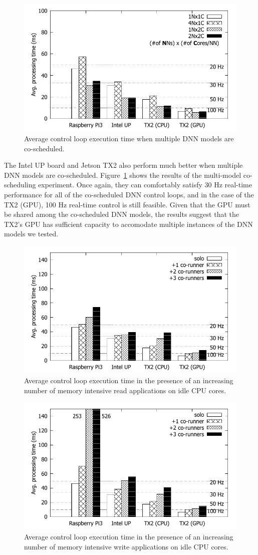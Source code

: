 \begin{figure}[h]
  \centering
  \includegraphics[width=.45\textwidth]{figs/compare_model}
  \caption{Average control loop execution time when multiple DNN
    models are co-scheduled. }
  \label{fig:sys_model}
\end{figure}

The Intel UP board and Jetson TX2 also perform much better when multiple DNN models
are co-scheduled. Figure~\ref{fig:sys_model} shows the results of the
multi-model co-scheduling experiment. Once again, they can comfortably
satisfy 30 Hz real-time performance for all of the co-scheduled DNN control
loops, and in the case of the TX2 (GPU), 100 Hz real-time control is still
feasible. Given that the GPU must be shared among the co-scheduled DNN
models, the results suggest that the TX2's GPU has sufficient capacity to
accomodate multiple instances of the DNN models we tested.

\begin{figure}[h]
  \centering
  \includegraphics[width=.45\textwidth]{figs/compare_benchmark_read}
  \caption{Average control loop execution time in the presence of an
    increasing number of memory intensive read applications on idle CPU cores.}
  \label{fig:sys_bench_read}
\end{figure} 

\begin{figure}[h]
  \centering
  \includegraphics[width=.45\textwidth]{figs/compare_benchmark}
  \caption{Average control loop execution time in the presence of an
    increasing number of memory intensive write applications on idle CPU cores.}
  \label{fig:sys_bench}
\end{figure} 

